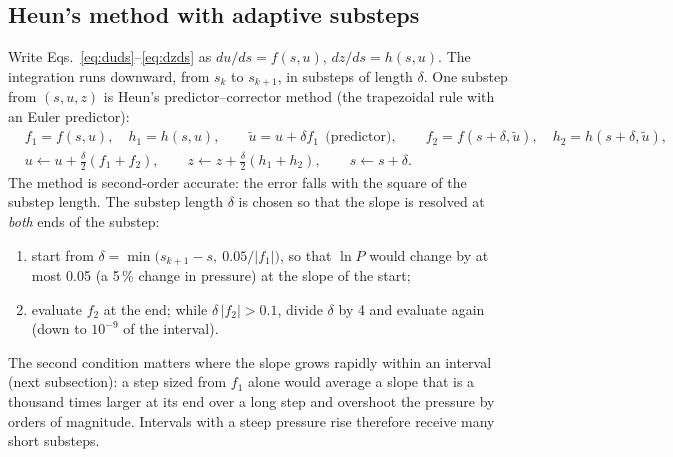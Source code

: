 \subsection{Heun's method with adaptive substeps}
Write Eqs.~\eqref{eq:duds}--\eqref{eq:dzds} as $du/ds=f(s,u)$, $dz/ds=h(s,u)$. The integration runs downward, from $s_k$ to
$s_{k+1}$, in substeps of length $\delta$. One substep from $(s,u,z)$ is Heun's predictor--corrector method (the
trapezoidal rule with an Euler predictor):
\begin{equation}
\begin{aligned}
&f_1=f(s,u),\quad h_1=h(s,u),\qquad \tilde u=u+\delta f_1\ \ \text{(predictor)},\qquad f_2=f(s+\delta,\tilde u),\quad h_2=h(s+\delta,\tilde u),\\
&u\leftarrow u+\tfrac{\delta}{2}(f_1+f_2),\qquad z\leftarrow z+\tfrac{\delta}{2}(h_1+h_2),\qquad s\leftarrow s+\delta .
\end{aligned}\label{eq:heun}
\end{equation}
The method is second-order accurate: the error falls with the square of the substep length. The substep length $\delta$ is
chosen so that the slope is resolved at \emph{both} ends of the substep:
\begin{enumerate}
\item start from $\delta=\min\big(s_{k+1}-s,\ 0.05/|f_1|\big)$, so that $\ln P$ would change by at most 0.05 (a 5\,\% change
in pressure) at the slope of the start;
\item evaluate $f_2$ at the end; while $\delta\,|f_2|>0.1$, divide $\delta$ by 4 and evaluate again (down to $10^{-9}$ of the
interval).
\end{enumerate}
The second condition matters where the slope grows rapidly within an interval (next subsection): a step sized from $f_1$
alone would average a slope that is a thousand times larger at its end over a long step and overshoot the pressure by
orders of magnitude. Intervals with a steep pressure rise therefore receive many short substeps.

